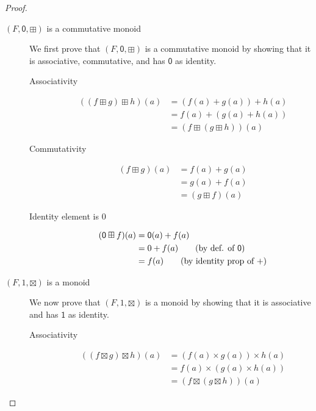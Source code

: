 \documentclass[runningheads]{llncs}
\begin{document}
\begin{proof}
	\begin{description}
		\item[ \((F, \mathsf{0} , \boxplus )\) is a commutative monoid] We first prove that \((F, \mathsf{0} , \boxplus )\) is a commutative monoid by showing that it is associative, commutative, and has \(\mathsf{0} \) as identity.
			\begin{description}
				\item[Associativity]
					\begin{align*}
						((f \boxplus g) \boxplus h)(a) & = (f(a) + g(a)) + h(a)                                          \\
						                               & = f(a) + (g(a) + h(a)) \tag{by assoc. of \(+\)}                 \\
						                               & = (f \boxplus (g \boxplus h))(a) \tag{by def. of \(\boxplus \)}
					\end{align*}

				\item[Commutativity]
					\begin{align*}
						(f \boxplus g)(a) & = f(a) + g(a)                                     \\
						                  & = g(a) + f(a)\tag{by commutativity of \(+\)}      \\
						                  & = (g \boxplus f)(a)\tag{by def. of \(\boxplus \)}
					\end{align*}

				\item[Identity element is \(0\)]
					\begin{align*}
						(\mathsf{0} \boxplus f)(a) & = \mathsf{0} (a) + f(a)                     \\
						                           & = 0 + f(a) \tag{by def. of \(\mathsf{0} \)} \\
						                           & = f(a) \tag{by identity prop of \(+\)}
					\end{align*}
			\end{description}

		\item[\((F, 1, \boxtimes )\) is a monoid] We now prove that \((F, 1, \boxtimes )\) is a monoid by showing that it is associative and has \(\mathsf{1} \) as identity.
			\begin{description}
				\item[Associativity]
					\begin{align*}
						((f \boxtimes g) \boxtimes h)(a) & = (f(a) \times g(a)) \times h(a)                                   \\
						                                 & = f(a) \times (g(a) \times h(a)) \tag{by assoc. of \(\times\) }    \\
						                                 & = (f \boxtimes (g \boxtimes h))(a) \tag{by def. of \(\boxtimes \)}
					\end{align*}


\end{description}
\end{description}
\end{proof}
\end{document}

